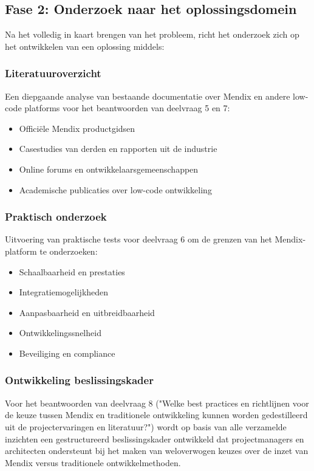 \subsection{Fase 2: Onderzoek naar het oplossingsdomein}
Na het volledig in kaart brengen van het probleem, richt het onderzoek zich op het ontwikkelen van een oplossing middels:
\subsubsection{Literatuuroverzicht}
Een diepgaande analyse van bestaande documentatie over Mendix en andere low-code platforms voor het beantwoorden van deelvraag 5 en 7:
\begin{itemize}
    \item Officiële Mendix productgidsen
    \item Casestudies van derden en rapporten uit de industrie
    \item Online forums en ontwikkelaarsgemeenschappen
    \item Academische publicaties over low-code ontwikkeling
\end{itemize}
\subsubsection{Praktisch onderzoek}
Uitvoering van praktische tests voor deelvraag 6 om de grenzen van het Mendix-platform te onderzoeken:
\begin{itemize}
    \item Schaalbaarheid en prestaties
    \item Integratiemogelijkheden
    \item Aanpasbaarheid en uitbreidbaarheid
    \item Ontwikkelingssnelheid
    \item Beveiliging en compliance
\end{itemize}
\subsubsection{Ontwikkeling beslissingskader}
Voor het beantwoorden van deelvraag 8 ("Welke best practices en richtlijnen voor de keuze tussen Mendix en traditionele ontwikkeling kunnen worden gedestilleerd uit de projectervaringen en literatuur?") wordt op basis van alle verzamelde inzichten een gestructureerd beslissingskader ontwikkeld dat projectmanagers en architecten ondersteunt bij het maken van weloverwogen keuzes over de inzet van Mendix versus traditionele ontwikkelmethoden.

